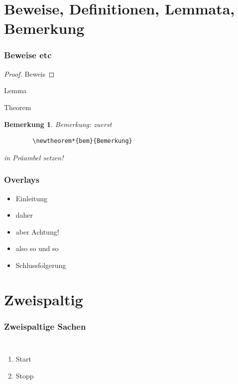 \documentclass[11pt]{beamer}
\newtheorem*{bem}{Bemerkung} %
\begin{document}
\section{Beweise, Definitionen, Lemmata, Bemerkung}
\begin{frame}[fragile]
	\frametitle{Beweise etc}

    \begin{proof}
        Beweis
    \end{proof}
    
    \begin{lemma}
        Lemma
    \end{lemma}
    
    \begin{theorem}
        Theorem
    \end{theorem}
    
     \begin{bem}
	Bemerkung: zuerst 
	  \begin{verbatim}
	    \newtheorem*{bem}{Bemerkung}
	  \end{verbatim}
	  in Präambel setzen! 
     \end{bem}
\end{frame}

\begin{frame}
	\frametitle{Overlays}
   \begin{itemize}
        \item Einleitung
        \item<2-> daher
        \item<alert@3> aber Achtung!
        \item<3-> also so und so
        \item<4-> Schlussfolgerung
   \end{itemize}
\end{frame}


\section{Zweispaltig}
\begin{frame}
	\frametitle{Zweispaltige Sachen}
    \begin{columns}
                 \begin{enumerate}
                 \item Start
                 \item Stopp
                 \end{enumerate}
    \end{columns}
\end{frame}
\end{document}
